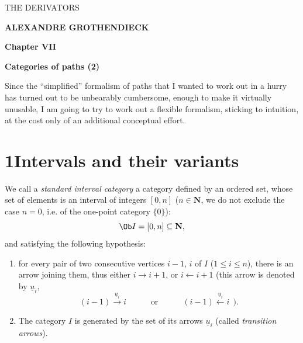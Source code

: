 \printedpage{}

\begin{center}
{\Large\textsf{THE DERIVATORS}}

\bigskip

\textbf{ALEXANDRE GROTHENDIECK}

\bigskip\bigskip

\textbf{Chapter VII}

\medskip

\textbf{Categories of paths (2)}
\end{center}

\newpage

\printedpage{}


\newpage


Since the ``simplified'' formalism of paths that I wanted to work out in a hurry has turned out to be unbearably cumbersome, enough to make it virtually unusable, I am going to try to work out a flexible formalism, sticking to intuition, at the cost only of an additional conceptual effort.

\section*{1\quad Intervals and their variants} %

We call a \textit{standard interval category} a category defined by an ordered set, whose set of elements is an interval of integers $[0,n]$ ($n\in\mathbf{N}$, we do not exclude the case $n=0$, i.e. of the one-point category $\{0\}$): %
\[
\Ob I=[0,n]\subseteq\mathbf{N},
\]
and satisfying the following hypothesis:

\begin{enumerate}
\item[a)] for every pair of two consecutive vertices $i-1$, $i$ of $I$ ($1\leq i\leq n$), there is an arrow joining them, thus either $i\longrightarrow i+1$, or $i\longleftarrow i+1$ (this arrow is denoted by $\underline{u}_i$,
\[
(i-1)\xrightarrow{\underline{u}_i}i\qquad\quad\text{or}\qquad\quad(i-1)\xleftarrow{\underline{u}_i}i\ \ ).
\]
\item[b)] The category $I$ is generated by the set of its arrows $\underline{u}_i$ (called \textit{transition arrows}).
\end{enumerate}

